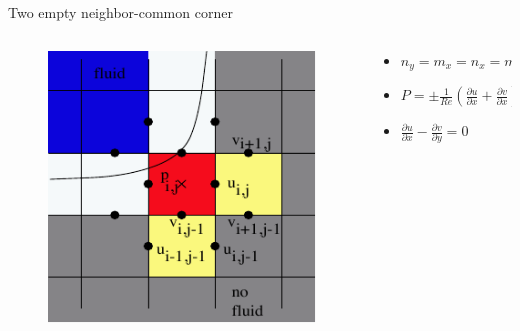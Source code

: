 \documentclass{beamer}
\begin{document}
	\begin{frame}{Two empty neighbor-common corner}
	    \begin{columns}
	 		\begin{column}[c]{0.4\textwidth}
		 		\begin{figure}
					\includegraphics[width=1\textwidth]{pic/two1.pdf}
		 		\end{figure}
			\end{column}
			\begin{column}[c]{0.6\textwidth}
				\begin{itemize}
					\item $ n_y = m_x=n_x = m_y  $
					\item $ P=\pm \frac{1}{Re}( \frac{\partial u}{\partial x}+  \frac{\partial v}{\partial x} ) $
					\item $ \frac{\partial u}{\partial x}- \frac{\partial v}{\partial y}=0 $
				\end{itemize}
			\end{column}
		\end{columns}		
	\end{frame}	
	
\end{document}
